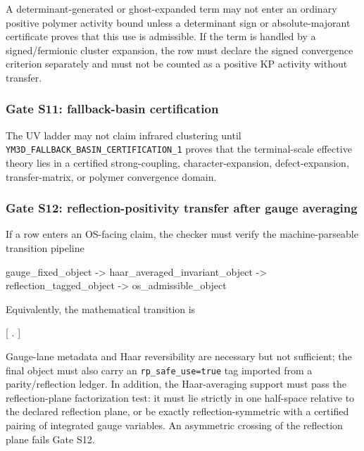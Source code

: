 \documentclass[
]{article}
\newenvironment{Shaded}{}{}
\newcommand{\NormalTok}[1]{#1}
\begin{document}
A determinant-generated or ghost-expanded term may not enter an ordinary
positive polymer activity bound unless a determinant sign or
absolute-majorant certificate proves that this use is admissible. If the
term is handled by a signed/fermionic cluster expansion, the row must
declare the signed convergence criterion separately and must not be
counted as a positive KP activity without transfer.

\subsubsection{Gate S11: fallback-basin
certification}\label{gate-s11-fallback-basin-certification}

The UV ladder may not claim infrared clustering until
\texttt{YM3D\_FALLBACK\_BASIN\_CERTIFICATION\_1} proves that the
terminal-scale effective theory lies in a certified strong-coupling,
character-expansion, defect-expansion, transfer-matrix, or polymer
convergence domain.

\subsubsection{Gate S12: reflection-positivity transfer after gauge
averaging}\label{gate-s12-reflection-positivity-transfer-after-gauge-averaging}

If a row enters an OS-facing claim, the checker must verify the
machine-parseable transition pipeline

\begin{Shaded}
\begin{Highlighting}[]
\NormalTok{gauge\_fixed\_object}
\NormalTok{  {-}\textgreater{} haar\_averaged\_invariant\_object}
\NormalTok{  {-}\textgreater{} reflection\_tagged\_object}
\NormalTok{  {-}\textgreater{} os\_admissible\_object}
\end{Highlighting}
\end{Shaded}

Equivalently, the mathematical transition is

{[}  \to {}
\to {} \to
{}. {]}

Gauge-lane metadata and Haar reversibility are necessary but not
sufficient; the final object must also carry an
\texttt{rp\_safe\_use=true} tag imported from a parity/reflection
ledger. In addition, the Haar-averaging support must pass the
reflection-plane factorization test: it must lie strictly in one
half-space relative to the declared reflection plane, or be exactly
reflection-symmetric with a certified pairing of integrated gauge
variables. An asymmetric crossing of the reflection plane fails Gate
S12.
\end{document}
